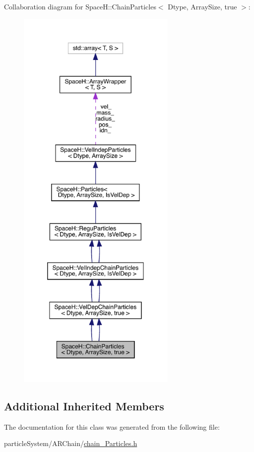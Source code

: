 Collaboration diagram for SpaceH\+:\+:Chain\+Particles$<$ Dtype, Array\+Size, true $>$\+:
\nopagebreak
\begin{figure}[H]
\begin{center}
\leavevmode
\includegraphics[height=550pt]{class_space_h_1_1_chain_particles_3_01_dtype_00_01_array_size_00_01true_01_4__coll__graph}
\end{center}
\end{figure}
\subsection*{Additional Inherited Members}


The documentation for this class was generated from the following file\+:\begin{DoxyCompactItemize}
\item 
particle\+System/\+A\+R\+Chain/\mbox{\hyperlink{chain_particles_8h}{chain_\+Particles.\+h}}\end{DoxyCompactItemize}
